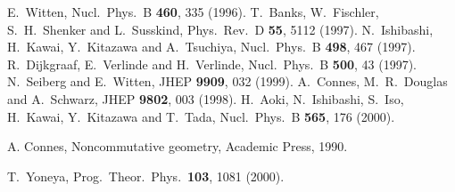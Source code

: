 \documentclass[a4paper,prl,showpacs,twocolumn]{revtex4}
\begin{document}
\begin{thebibliography}{all}

E.~Witten,
Nucl.\ Phys.\ B {\bf 460}, 335 (1996).
T.~Banks, W.~Fischler, S.~H.~Shenker and L.~Susskind,
Phys.\ Rev.\ D {\bf 55}, 5112 (1997).
N.~Ishibashi, H.~Kawai, Y.~Kitazawa and A.~Tsuchiya,
Nucl.\ Phys.\ B {\bf 498}, 467 (1997).
R.~Dijkgraaf, E.~Verlinde and H.~Verlinde,
Nucl.\ Phys.\ B {\bf 500}, 43 (1997).
N.~Seiberg and E.~Witten,
JHEP {\bf 9909}, 032 (1999).
A.~Connes, M.~R.~Douglas and A.~Schwarz,
JHEP {\bf 9802}, 003 (1998).
H.~Aoki, N.~Ishibashi, S.~Iso, H.~Kawai, Y.~Kitazawa and T.~Tada,
Nucl.\ Phys.\ B {\bf 565}, 176 (2000).

A. Connes, Noncommutative geometry, Academic Press, 1990.

T.~Yoneya,
Prog.\ Theor.\ Phys.\  {\bf 103}, 1081 (2000).


\end{thebibliography}
\end{document}
